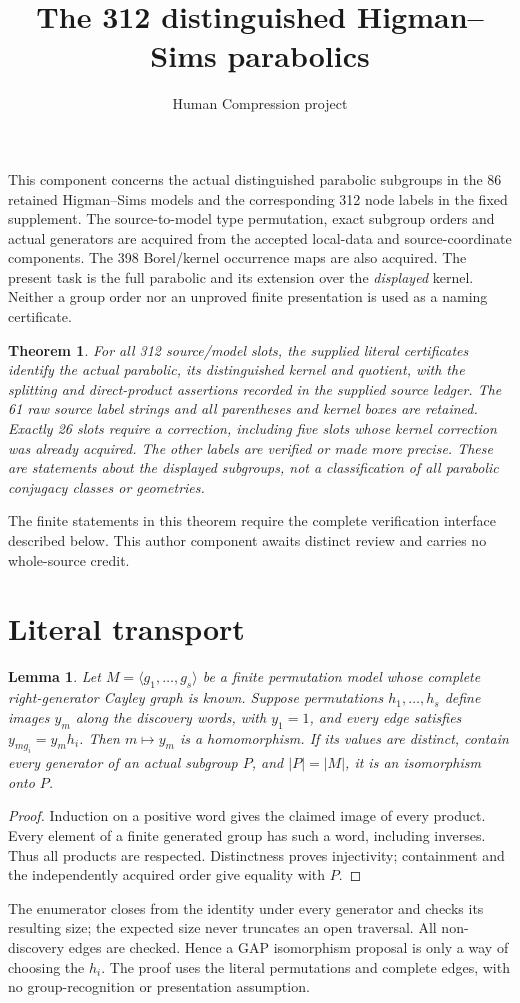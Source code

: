 \documentclass[10pt,a4paper]{article}
\title{The 312 distinguished Higman--Sims parabolics}
\author{Human Compression project}\date{}
\newtheorem{theorem}{Theorem}\newtheorem{lemma}{Lemma}
\begin{document}
\maketitle
This component concerns the actual distinguished parabolic subgroups in the
86 retained Higman--Sims models and the corresponding 312 node labels in the
fixed supplement. The source-to-model type permutation, exact subgroup
orders and actual generators are acquired from the accepted local-data and
source-coordinate components. The 398 Borel/kernel occurrence maps are also
acquired. The present task is the full parabolic and its extension over the
\emph{displayed} kernel. Neither a group order nor an unproved finite
presentation is used as a naming certificate.

\begin{theorem}
For all 312 source/model slots, the supplied literal certificates identify
the actual parabolic, its distinguished kernel and quotient, with the
splitting and direct-product assertions recorded in the supplied source ledger.
The 61 raw source label strings and all parentheses and kernel boxes are
retained. Exactly 26 slots require a correction, including five slots whose
kernel correction was already acquired. The other labels are verified or
made more precise. These are statements about the displayed subgroups,
not a classification of all parabolic conjugacy classes or geometries.
\end{theorem}
The finite statements in this theorem require the complete verification
interface described below. This author component awaits distinct review and carries no whole-source
credit.

\section*{Literal transport}
\begin{lemma}
Let $M=\langle g_1,\ldots,g_s\rangle$ be a finite permutation model whose
complete right-generator Cayley graph is known. Suppose permutations
$h_1,\ldots,h_s$ define images $y_m$ along the discovery words, with $y_1=1$,
and every edge satisfies $y_{mg_i}=y_mh_i$. Then $m\mapsto y_m$ is a
homomorphism. If its values are distinct, contain every generator of an
actual subgroup $P$, and $|P|=|M|$, it is an isomorphism onto $P$.
\end{lemma}
\begin{proof}
Induction on a positive word gives the claimed image of every product.
Every element of a finite generated group has such a word, including
inverses. Thus all products are respected. Distinctness proves injectivity;
containment and the independently acquired order give equality with $P$.
\end{proof}
The enumerator closes from the identity under every generator and checks
its resulting size; the expected size never truncates an open traversal.
All non-discovery edges are checked. Hence a GAP isomorphism proposal is
only a way of choosing the $h_i$. The proof uses the literal permutations
and complete edges, with no group-recognition or presentation assumption.
\end{document}
